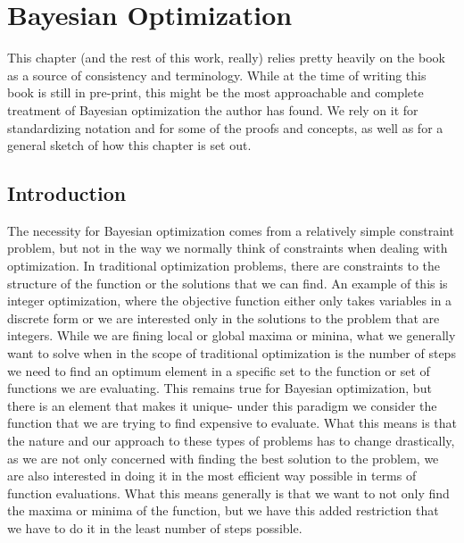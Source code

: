 \chapter{Bayesian Optimization}

This chapter (and the rest of this work, really) relies pretty heavily on the book \cite{garnett_bayesoptbook_2023} as a source of consistency and terminology. While at the time of writing this book is still in pre-print, this might be the most approachable and complete treatment of Bayesian optimization the author has found. We rely on it for standardizing notation and for some of the proofs and concepts, as well as for a general sketch of how this chapter is set out. 

\section{Introduction}

The necessity for Bayesian optimization comes from a relatively simple constraint problem, but not in the way we normally think of constraints when dealing with optimization. In traditional optimization problems, there are constraints to the structure of the function or the solutions that we can find. An example of this is integer optimization, where the objective function either only takes variables in a discrete form or we are interested only in the solutions to the problem that are integers. While we are fining local or global maxima or minina, what we generally want to solve when in the scope of traditional optimization is the number of steps we need to find an optimum element in a specific set to the function or set of functions we are evaluating. This remains true for Bayesian optimization, but there is an element that makes it unique- under this paradigm we consider the function that we are trying to find expensive to evaluate. What this means is that the nature and our approach to these types of problems has to change drastically, as we are not only concerned with finding the best solution to the problem, we are also interested in doing it in the most efficient way possible in terms of function evaluations. What this means generally is that we want to not only find the maxima or minima of the function, but we have this added restriction that we have to do it in the least number of steps possible. 


